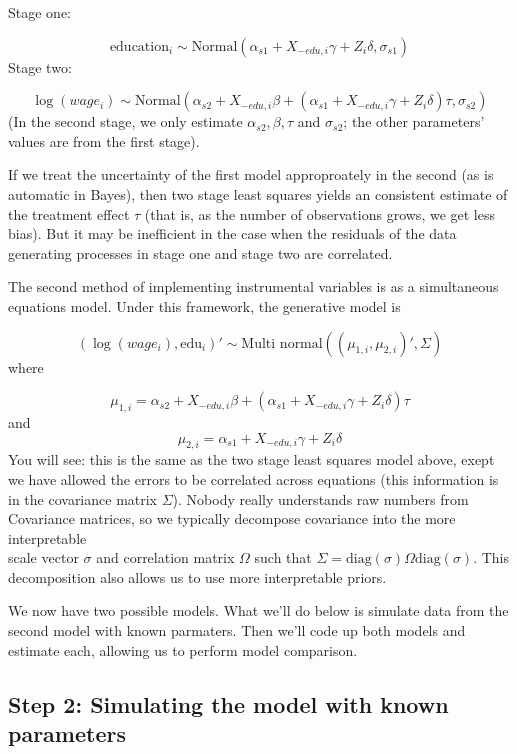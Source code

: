 \documentclass[]{book}
\begin{document}
Stage one:

\[
\mbox{education}_{i} \sim \mbox{Normal}(\alpha_{s1} + X_{-edu,i}\gamma + Z_{i}\delta, \sigma_{s1})
\] Stage two:

\[
\log(wage_{i})  \sim \mbox{Normal}(\alpha_{s2} + X_{-edu,i}\beta + (\alpha_{s1} + X_{-edu,i}\gamma + Z_{i}\delta)\tau, \sigma_{s2})
\] (In the second stage, we only estimate \(\alpha_{s2}, \beta, \tau\)
and \(\sigma_{s2}\); the other parameters' values are from the first
stage).

If we treat the uncertainty of the first model approproately in the
second (as is automatic in Bayes), then two stage least squares yields
an consistent estimate of the treatment effect \(\tau\) (that is, as the
number of observations grows, we get less bias). But it may be
inefficient in the case when the residuals of the data generating
processes in stage one and stage two are correlated.

The second method of implementing instrumental variables is as a
simultaneous equations model. Under this framework, the generative model
is

\[
(\log(wage_{i}), \mbox{edu}_{i})' \sim \mbox{Multi normal}\left((\mu_{1,i}, \mu_{2, i})', \Sigma\right)
\] where

\[
\mu_{1,i} = \alpha_{s2} + X_{-edu,i}\beta + (\alpha_{s1} + X_{-edu,i}\gamma + Z_{i}\delta)\tau
\] and \[
\mu_{2,i} = \alpha_{s1} + X_{-edu,i}\gamma + Z_{i}\delta
\] You will see: this is the same as the two stage least squares model
above, exept we have allowed the errors to be correlated across
equations (this information is in the covariance matrix \(\Sigma\)).
Nobody really understands raw numbers from Covariance matrices, so we
typically decompose covariance into the more interpretable\\
scale vector \(\sigma\) and correlation matrix \(\Omega\) such that
\(\Sigma = \mbox{diag}(\sigma)\Omega \mbox{diag}(\sigma)\). This
decomposition also allows us to use more interpretable priors.

We now have two possible models. What we'll do below is simulate data
from the second model with known parmaters. Then we'll code up both
models and estimate each, allowing us to perform model comparison.

\subsection{Step 2: Simulating the model with known
parameters}\label{step-2-simulating-the-model-with-known-parameters}
\end{document}
